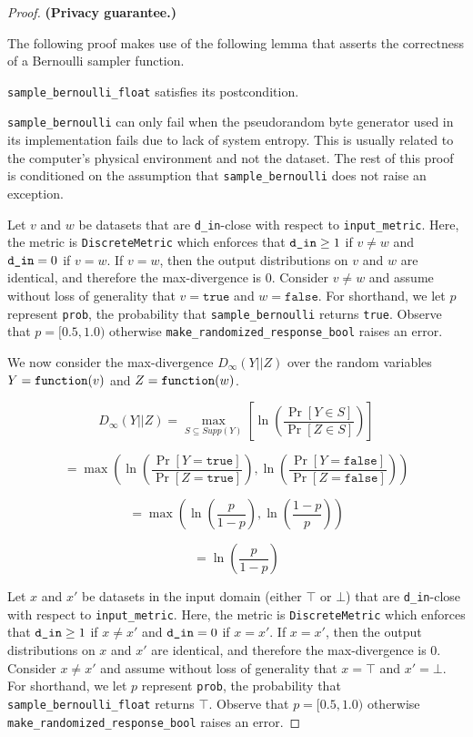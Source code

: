 \documentclass{article}
\begin{document}
\begin{proof} 
\textbf{(Privacy guarantee.)} 

\begin{tcolorbox}
\begin{note}
    The following proof makes use of the following lemma that asserts the correctness of a Bernoulli sampler function.
    \begin{lemma}
        \texttt{sample\_bernoulli\_float} satisfies its postcondition.
    \end{lemma}
\end{note}
\end{tcolorbox}

    \texttt{sample\_bernoulli} can only fail when the pseudorandom byte generator used in its implementation fails due to lack of system entropy. 
    This is usually related to the computer's physical environment and not the dataset. 
    The rest of this proof is conditioned on the assumption that \texttt{sample\_bernoulli} does not raise an exception. 
    
    Let $v$ and $w$ be datasets that are \texttt{d\_in}-close with respect to \texttt{input\_metric}.
    Here, the metric is \texttt{DiscreteMetric} which enforces that $\texttt{d\_in} \geq 1$ if $v \ne w$ and $\texttt{d\_in} = 0$ if $v = w$. 
    If $v = w$, then the output distributions on $v$ and $w$ are identical, and therefore the max-divergence is 0.
    Consider $v \ne w$ and assume without loss of generality that $v = \texttt{true}$ and $w = \texttt{false}$. 
    For shorthand, we let $p$ represent \texttt{prob}, the probability that \texttt{sample\_bernoulli} returns \texttt{true}. 
    Observe that $p = [0.5, 1.0)$ otherwise \texttt{make\_randomized\_response\_bool} raises an error. 
    
    We now consider the max-divergence $D_{\infty}(Y||Z)$ over the random variables $Y = \texttt{function}(v)$ and $Z = \texttt{function}(w)$.
    
    \[
    D_{\infty}(Y||Z) = \max_{S \subseteq Supp(Y)}\left[\ln (\frac{\Pr[Y \in S]}{\Pr[Z \in S]})\right] 
    \]
    
    \[
    = \max\left(\ln (\frac{\Pr[Y = \texttt{true}]}{\Pr[Z = \texttt{true}]}), \ln(\frac{\Pr[Y = \texttt{false}]}{\Pr[Z = \texttt{false}]})\right)
    \]
    
    \[
    = \max\left(\ln (\frac{p}{1 - p}), \ln(\frac{1 - p}{p})\right)
    \]
    
    \[
    = \ln (\frac{p}{1 - p})
    \]

Let $x$ and $x'$ be datasets in the input domain (either $\top$ or $\bot$) that are \texttt{d\_in}-close with respect to \texttt{input\_metric}.
Here, the metric is \texttt{DiscreteMetric} which enforces that $\texttt{d\_in} \geq 1$ if $x \ne x'$ and $\texttt{d\_in} = 0$ if $x = x'$. 
If $x = x'$, then the output distributions on $x$ and $x'$ are identical, and therefore the max-divergence is 0.
Consider $x \ne x'$ and assume without loss of generality that $x = \top$ and $x' = \bot$. 
For shorthand, we let $p$ represent \texttt{prob}, the probability that \texttt{sample\_bernoulli\_float} returns $\top$. 
Observe that $p = [0.5, 1.0)$ otherwise \texttt{make\_randomized\_response\_bool} raises an error. 


\end{proof}
\end{document}
